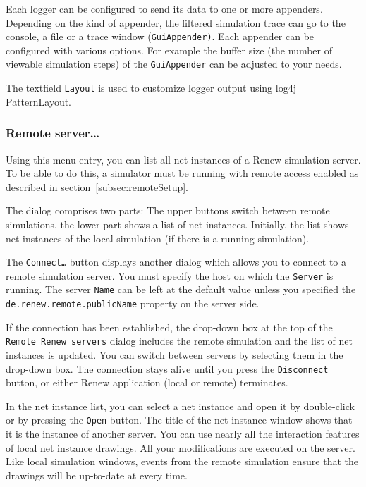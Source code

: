 Each logger can be configured to send its data to one or more appenders.
Depending on the kind of appender, the filtered simulation trace can go to
the console, a file or a trace window (\texttt{GuiAppender)}.
Each appender can be configured with various options.
For example the buffer size (the number of viewable simulation steps) of
the \texttt{GuiAppender} can be adjusted to your needs. 

The textfield \texttt{Layout} is used to customize logger output 
using log4j PatternLayout.

\subsubsection{Remote server\dots{}}
\label{subsec:connectToServer}

Using this menu entry, you can list all net instances of a
Renew simulation server. To be able to do this, a simulator must be running
with remote access enabled as described in
section~\ref{subsec:remoteSetup}.

The dialog comprises two parts:
The upper buttons switch between remote simulations, the lower
part shows a list of net instances.
Initially, the list shows net instances of the local simulation
(if there is a running simulation).

The \texttt{Connect\dots} button displays another dialog which
allows you to connect to a remote simulation server.
You must specify the host on which the \texttt{Server} is running.
The server \texttt{Name} can be left at the default value unless
you specified the \texttt{de.renew.remote.publicName} property on
the server side.

If the connection has been established, the drop-down box at the
top of the \texttt{Remote Renew servers} dialog includes the
remote simulation and the list of net instances is updated.
You can switch between servers by selecting them in the drop-down
box.
The connection stays alive until you press the
\texttt{Disconnect} button, or either Renew application (local or
remote) terminates.

In the net instance list, you can select a net instance and open
it by double-click or by pressing the \texttt{Open} button.
The title of the net instance window shows that it is the
instance of another server.
You can use nearly all the interaction features of local net instance
drawings. All your modifications are executed on the server. Like
local simulation windows, events from the remote simulation
ensure that the drawings will be up-to-date at every time.

